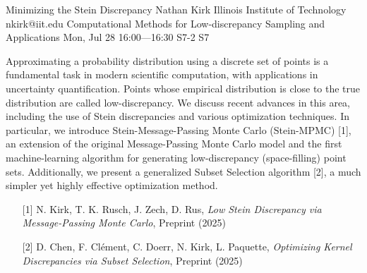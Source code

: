 \begin{talk}
  {Minimizing the Stein Discrepancy}%
  {Nathan Kirk}%
  {Illinois Institute of Technology}%
  {nkirk@iit.edu}%
  {Computational Methods for Low-discrepancy Sampling and Applications}%
  {}%
  {Mon, Jul 28 16:00---16:30}%
  {S7-2}%
  {S7}%
    
   
Approximating a probability distribution using a discrete set of points is a fundamental task in modern scientific computation, with applications in uncertainty quantification. Points whose empirical distribution is close to the true distribution are called low-discrepancy. We discuss recent advances in this area, including the use of Stein discrepancies and various optimization techniques. In particular, we introduce Stein-Message-Passing Monte Carlo (Stein-MPMC) [1], an extension of the original Message-Passing Monte Carlo model and the first machine-learning algorithm for generating low-discrepancy (space-filling) point sets. Additionally, we present a generalized Subset Selection algorithm [2], a much simpler yet highly effective optimization method.

\medskip

\begin{enumerate}
 \item[{[1]}] N. Kirk, T. K. Rusch, J. Zech, D. Rus, \textit{Low Stein Discrepancy via Message-Passing Monte Carlo}, Preprint (2025)
 \item[{[2]}] D. Chen, F. Cl\'ement, C. Doerr, N. Kirk, L. Paquette, \textit{Optimizing Kernel Discrepancies via Subset Selection}, Preprint (2025)
\end{enumerate}


\end{talk}

